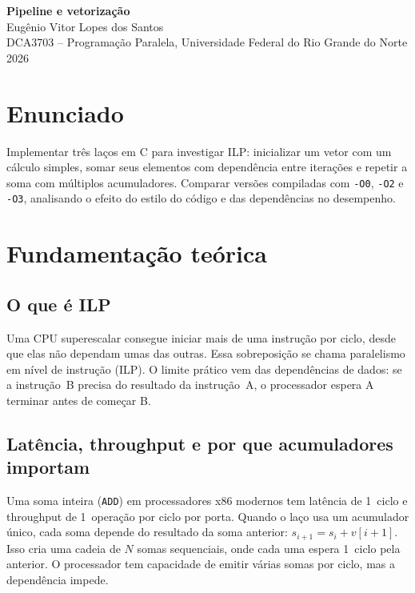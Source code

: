 \documentclass[11pt,letterpaper]{article}
\begin{document}
\pagestyle{plain}

\begin{center}
    {\LARGE\bfseries Pipeline e vetorização}\\[0.4em]
    {\normalsize Eugênio Vitor Lopes dos Santos}\\[0.3em]
    {\small DCA3703 -- Programação Paralela, Universidade Federal do Rio Grande do Norte}\\[0.3em]
    {\small 2026}
\end{center}


\section{Enunciado}
Implementar três laços em C para investigar ILP: inicializar um vetor com um
cálculo simples, somar seus elementos com dependência entre iterações e repetir
a soma com múltiplos acumuladores. Comparar versões compiladas com \texttt{-O0},
\texttt{-O2} e \texttt{-O3}, analisando o efeito do estilo do código e das
dependências no desempenho.

\section{Fundamentação teórica}

\subsection{O que é ILP}
Uma CPU superescalar consegue iniciar mais de uma instrução por ciclo, desde que
elas não dependam umas das outras. Essa sobreposição se chama paralelismo em
nível de instrução (ILP). O limite prático vem das dependências de dados: se a
instrução~B precisa do resultado da instrução~A, o processador espera A terminar
antes de começar B.

\subsection{Latência, throughput e por que acumuladores importam}
Uma soma inteira (\texttt{ADD}) em processadores x86 modernos tem latência de
1~ciclo e throughput de 1~operação por ciclo por porta. Quando o laço usa um
acumulador único, cada soma depende do resultado da soma anterior:
\(s_{i+1}=s_i+v[i+1]\). Isso cria uma cadeia de $N$ somas sequenciais, onde
cada uma espera 1~ciclo pela anterior. O processador tem capacidade de emitir
várias somas por ciclo, mas a dependência impede.
\end{document}
